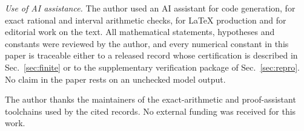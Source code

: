 \documentclass[aps,10pt,superscriptaddress,floatfix,amsmath,amssymb,nofootinbib]{revtex4-2}
\begin{document}
\emph{Use of AI assistance.} The author used an AI assistant for code generation, for exact
rational and interval arithmetic checks, for LaTeX production and for editorial work on the
text. All mathematical statements, hypotheses and constants were reviewed by the author, and
every numerical constant in this paper is traceable either to a released record whose
certification is described in Sec.~\ref{sec:finite} or to the supplementary verification
package of Sec.~\ref{sec:repro}. No claim in the paper rests on an unchecked model output.

\begin{acknowledgments}
The author thanks the maintainers of the exact-arithmetic and proof-assistant toolchains
used by the cited records. No external funding was received for this work.
\end{acknowledgments}


\end{document}
